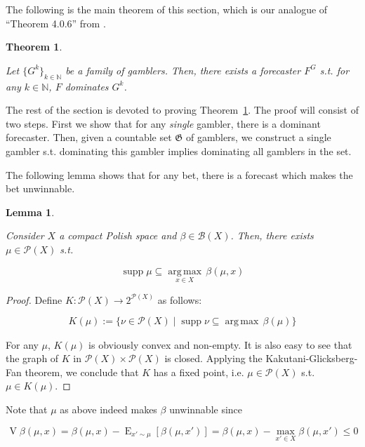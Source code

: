 \documentclass[11pt]{article}
\theoremstyle{definition}
\theoremstyle{plain}
\newtheorem{theorem}{Theorem}%
\newtheorem{lemma}{Lemma}%
\newcommand{\Nats}{\mathbb{N}}
\newcommand{\Argmax}[1]{\underset{#1}{\operatorname{arg\,max}}\,}
\newcommand{\Sq}[2]{\{#1\}_{#2 \in \Nats}}
\DeclareMathOperator{\E}{E}
\newcommand{\PM}{\mathcal{P}}
\DeclareMathOperator{\Sp}{supp}
\newcommand{\Gm}{\mathcal{B}}
\newcommand{\GC}{\mathfrak{G}}
\DeclareMathOperator{\V}{V}
\begin{document}
The following is the main theorem of this section, which is our analogue of \enquote{Theorem 4.0.6} from \cite{Garrabrant_2016}.

\begin{theorem}
\label{thm:exist_dominant}

Let $\Sq{G^k}{k}$ be a family of gamblers. Then, there exists a forecaster $F^G$ s.t. for any $k \in \Nats$, $F$ dominates $G^k$.

\end{theorem}

The rest of the section is devoted to proving Theorem~\ref{thm:exist_dominant}. The proof will consist of two steps. First we show that for any \emph{single} gambler, there is a dominant forecaster. Then, given a countable set $\GC$ of gamblers, we construct a single gambler s.t. dominating this gambler implies dominating all gamblers in the set.

The following lemma shows that for any bet, there is a forecast which makes the bet unwinnable.

\begin{lemma}
\label{lmm:unwinnable}

Consider $X$ a compact Polish space and $\beta \in \Gm\left(X\right)$. Then, there exists $\mu \in \PM\left(X\right)$ s.t.

\begin{equation}
\Sp \mu \subseteq \Argmax{x\in X} \beta\left(\mu,x\right)
\end{equation}

\end{lemma}

\begin{proof}

Define ${K: \PM\left(X\right) \rightarrow 2^{\PM\left(X\right)}}$ as follows:

\[K\left(\mu\right):=\{\nu \in \PM\left(X\right) \mid \Sp{\nu} \subseteq \Argmax{}{\beta\left(\mu\right)}\}\]

For any ${\mu}$, ${K}\left(\mu\right)$ is obviously convex and non-empty. It is also easy to see that the graph of $K$ in $\PM\left(X\right) \times \PM\left(X\right)$ is closed. Applying the Kakutani-Glicksberg-Fan theorem, we conclude that $K$ has a fixed point, i.e. $\mu \in \PM\left(X\right)$ s.t. $\mu \in K\left(\mu\right)$.
\end{proof}

Note that $\mu$ as above indeed makes $\beta$ unwinnable since

$$\V{\beta}(\mu,x) = \beta\left(\mu,x\right) - \E_{x' \sim \mu}\left[\beta\left(\mu,x'\right)\right] = \beta(\mu,x)- \max_{x'\in X} \beta\left(\mu,x'\right) \leq 0$$
\end{document}
